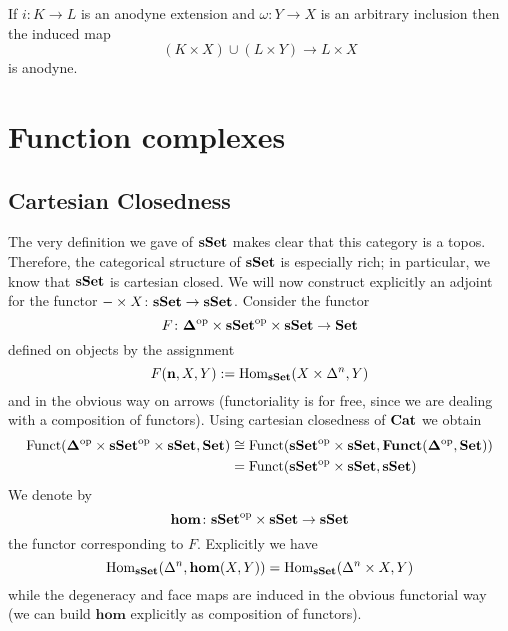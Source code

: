 \begin{refsection}
\begin{cor}
If $i \colon K \to L$ is an anodyne extension and $\omega \colon Y \to X$ is an arbitrary inclusion then the induced map
\[
(K \times X) \cup (L \times Y) \to L \times X
\]
is anodyne.
\end{cor}
%

\section{Function complexes}

\subsection{Cartesian Closedness}

The very definition we gave of $\mathbf{sSet}$ makes clear that this category is a topos. Therefore, the categorical structure of $\mathbf{sSet}$ is especially rich; in particular, we know that $\mathbf{sSet}$ is cartesian closed. We will now construct explicitly an adjoint for the functor $- \times X \colon \mathbf{sSet} \to \mathbf{sSet}$. Consider the functor
\[
F \colon \mathbf \Delta^{\mathrm{op}} \times \mathbf{sSet}^{\mathrm{op}} \times \mathbf{sSet} \to \mathbf{Set}
\]
defined on objects by the assignment
\[
F(\mathbf n, X,Y) := \mathrm{Hom}_{\mathbf{sSet}}(X \times \Delta^n, Y)
\]
and in the obvious way on arrows (functoriality is for free, since we are dealing with a composition of functors). Using cartesian closedness of $\mathbf{Cat}$ we obtain
\begin{align*}
\mathrm{Funct}(\mathbf \Delta^{\mathrm{op}} \times \mathbf{sSet}^{\mathrm{op}} \times \mathbf{sSet}, \mathbf{Set}) & \cong \mathrm{Funct}(\mathbf{sSet}^{\mathrm{op}} \times \mathbf{sSet}, \mathbf{Funct}(\mathbf{\Delta}^{\mathrm{op}}, \mathbf{Set})) \\
& = \mathrm{Funct}(\mathbf{sSet}^{\mathrm{op}} \times \mathbf{sSet}, \mathbf{sSet})
\end{align*}
We denote by
\[
\mathbf{hom} \colon \mathbf{sSet}^{\mathrm{op}} \times \mathbf{sSet} \to \mathbf{sSet}
\]
the functor corresponding to $F$. Explicitly we have
\[
\mathrm{Hom}_{\mathbf{sSet}}(\Delta^n, \mathbf{hom}(X,Y)) = \mathrm{Hom}_{\mathbf{sSet}}(\Delta^n \times X, Y)
\]
while the degeneracy and face maps are induced in the obvious functorial way (we can build $\mathbf{hom}$ explicitly as composition of functors).


\end{refsection}
